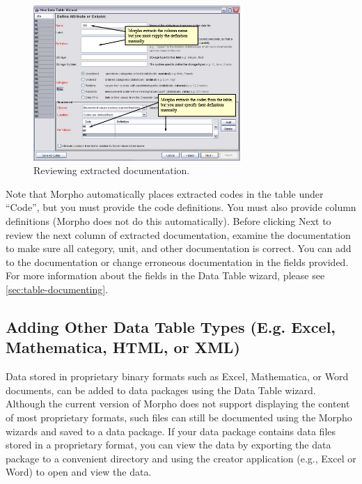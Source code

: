 \begin{figure}
  \centering
    \includegraphics[width=0.7\textwidth]{images/wizard-table-attribute-extraction}
  \caption{Reviewing extracted documentation.}
  \label{fig:wizard-table-attribute-extraction}
\end{figure}

Note that Morpho automatically places extracted codes in the table under
``Code'', but you must provide the code definitions. You must also
provide column definitions (Morpho does not do this automatically).
Before clicking Next to review the next column of extracted
documentation, examine the documentation to make sure all category,
unit, and other documentation is correct. You can add to the
documentation or change erroneous documentation in the fields provided.
For more information about the fields in the Data Table wizard, please
see \autoref{sec:table-documenting}.

\subsection[Adding Other Data Table Types]{Adding Other Data Table Types (E.g. 
Excel, Mathematica, HTML, or XML)} \label{sec:table-other-types}

Data stored in proprietary binary formats such as Excel, Mathematica, or
Word documents, can be
added to data packages using the Data Table wizard. Although the current
version of Morpho does not support displaying the content of most proprietary
formats, such files can still be documented using the Morpho wizards and
saved to a data package. If your data package contains data files stored
in a proprietary format, you can view the data by exporting the data
package to a convenient directory and using the creator application
(e.g., Excel or Word) to open and view the data.

